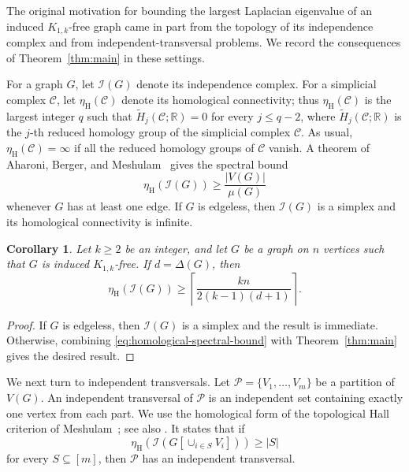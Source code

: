 \documentclass[11pt]{article}
\theoremstyle{plain}
\newtheorem{corollary}{Corollary}[section]
\theoremstyle{definition}
\numberwithin{equation}{section}
\begin{document}
The original motivation for bounding the largest Laplacian eigenvalue of an induced
$K_{1,k}$-free graph came in part from the topology of its independence
complex and from independent-transversal problems. We record the consequences
of Theorem~\ref{thm:main} in these settings.

For a graph $G$, let $\mathcal{I}(G)$ denote its independence complex. For a
simplicial complex $\mathcal{C}$, let $\eta_{\mathrm{H}}(\mathcal{C})$ denote its
homological connectivity; thus $\eta_{\mathrm{H}}(\mathcal{ C})$ is the largest
integer $q$ such that
$\widetilde{H}_j(\mathcal{C}; \mathbb{R}) = 0$ for every $j\leq q-2$, where $\widetilde{H}_j(\mathcal{C}; \mathbb{R})$ is the $j$-th reduced homology group of the simplicial complex $\mathcal{C}$.
As usual, $\eta_{\mathrm H}(\mathcal C)=\infty$ if all the reduced homology
groups of $\mathcal C$ vanish.  A theorem of Aharoni, Berger, and
Meshulam~\cite{AharoniBergerMeshulam} gives the spectral bound
\begin{equation}\label{eq:homological-spectral-bound}
\eta_{\mathrm{H}}(\mathcal{I}(G))
\geq \frac{|V(G)|}{\mu(G)}
\end{equation}
whenever $G$ has at least one edge. If $G$ is edgeless, then
$\mathcal I(G)$ is a simplex and its homological connectivity is infinite.

\begin{corollary}\label{cor:homological-connectivity}
Let $k\geq 2$ be an integer, and let $G$ be a graph on $n$ vertices such 
that $G$ is induced $K_{1,k}$-free. If $d=\Delta(G)$, then
\[
\eta_{\mathrm{H}}(\mathcal{I}(G))
\geq \left\lceil\frac{kn}{2(k-1)(d+1)}\right\rceil.
\]
\end{corollary}

\begin{proof}
If $G$ is edgeless, then $\mathcal{I}(G)$ is a simplex and the result is
immediate. Otherwise, combining \eqref{eq:homological-spectral-bound} with
Theorem~\ref{thm:main} gives the desired result. 
\end{proof}

We next turn to independent transversals. Let
$\mathcal P=\{V_1,\ldots,V_m\}$ be a partition of $V(G)$. An independent
transversal of $\mathcal P$ is an independent set containing exactly one
vertex from each part.  We use the homological form of the topological Hall
criterion of Meshulam~\cite{MeshulamClique}; see also
\cite[Section~3]{AharoniAlonBerger}. It states that if
\begin{equation}\label{eq:topological-hall}
\eta_{\mathrm{H}}\left(\mathcal{I}\left(G\left[\cup_{i\in S} V_i\right]\right)\right) \geq |S|
\end{equation}
for every $S\subseteq [m]$, then $\mathcal{P}$ has an independent transversal.
\end{document}
